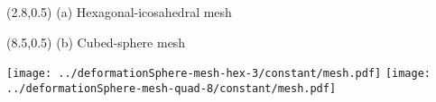 \documentclass{article}
\begin{document}
\TPMargin{2pt}
\begin{textblock}{5}(2.8,0.5)
\normalsize
(a) Hexagonal-icosahedral mesh
\end{textblock}
\begin{textblock}{4}(8.5,0.5)
\normalsize
(b) Cubed-sphere mesh
\end{textblock}
\centering
\vspace*{1em}
\texttt{[image: ../deformationSphere-mesh-hex-3/constant/mesh.pdf]}
\hspace*{2em}
\texttt{[image: ../deformationSphere-mesh-quad-8/constant/mesh.pdf]}
\end{document}
